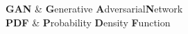 \clearpage
\pagestyle{fancy} %
{
   \textbf{GAN} & \textbf{G}enerative \textbf{A}dversarial\textbf{N}etwork \\
   \textbf{PDF} & \textbf{P}robability \textbf{D}ensity \textbf{F}unction\\
}
